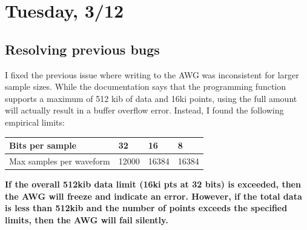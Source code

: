 \documentclass{article}
\begin{document}
    \section*{Tuesday, 3/12} 
    \subsection*{Resolving previous bugs}
    I fixed the previous issue where writing to the AWG was inconsistent for larger sample sizes. While the documentation says that the programming function supports a maximum of 512 kib of data and 16ki points, using the full amount will actually result in a buffer overflow error. Instead, I found the following empirical limits:
    \begin{table}[H]
    \centering
    \begin{tabular}{|l|l|l|l|}
    \hline
    Bits per sample & 32 & 16 & 8 \\ \hline
    Max samples per waveform & 12000 & 16384 & 16384 \\ \hline
    \end{tabular}
    \end{table}
    \textbf{If the overall 512kib data limit (16ki pts at 32 bits) is exceeded, then the AWG will freeze and indicate an error. However, if the total data is less than 512kib and the number of points exceeds the specified limits, then the AWG will fail silently.}
\end{document}
